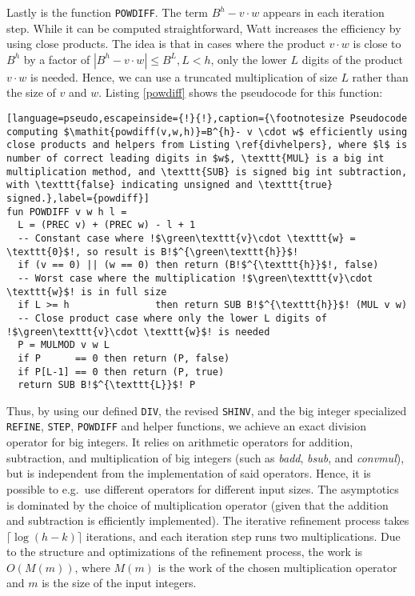Lastly is the function \texttt{POWDIFF}. The term $B^h-v \cdot w$ appears in each
iteration step. While it can be computed straightforward, Watt increases the
efficiency by using close products. The idea is that in cases where the product
$v\cdot w$ is close to $B^h$ by a factor of $|B^h- v\cdot w|\leq B^L, L < h$, only the
lower $L$ digits of the product $v \cdot w$ is needed. Hence, we can use a truncated
multiplication of size $L$ rather than the size of $v$ and $w$. Listing
\ref{powdiff} shows the pseudocode for this function:
\begin{lstlisting}[language=pseudo,escapeinside={!}{!},caption={\footnotesize Pseudocode computing $\mathit{powdiff(v,w,h)}=B^{h}- v \cdot w$ efficiently using close products and helpers from Listing \ref{divhelpers}, where $l$ is number of correct leading digits in $w$, \texttt{MUL} is a big int multiplication method, and \texttt{SUB} is signed big int subtraction, with \texttt{false} indicating unsigned and \texttt{true} signed.},label={powdiff}]
fun POWDIFF v w h l =
  L = (PREC v) + (PREC w) - l + 1
  -- Constant case where !$\green\texttt{v}\cdot \texttt{w} = \texttt{0}$!, so result is B!$^{\green\texttt{h}}$!
  if (v == 0) || (w == 0) then return (B!$^{\texttt{h}}$!, false)
  -- Worst case where the multiplication !$\green\texttt{v}\cdot \texttt{w}$! is in full size
  if L >= h               then return SUB B!$^{\texttt{h}}$! (MUL v w)
  -- Close product case where only the lower L digits of !$\green\texttt{v}\cdot \texttt{w}$! is needed
  P = MULMOD v w L
  if P      == 0 then return (P, false)
  if P[L-1] == 0 then return (P, true)
  return SUB B!$^{\texttt{L}}$! P
\end{lstlisting}

Thus, by using our defined \texttt{DIV}, the revised \texttt{SHINV}, and the big
integer specialized \texttt{REFINE}, \texttt{STEP}, \texttt{POWDIFF} and helper
functions, we achieve an exact division operator for big integers. It relies on
arithmetic operators for addition, subtraction, and multiplication of big
integers (such as \textit{badd}, \textit{bsub}, and \textit{convmul}), but is
independent from the implementation of said operators. Hence, it is possible to
e.g.\ use different operators for different input sizes. The asymptotics is
dominated by the choice of multiplication operator (given that the addition and
subtraction is efficiently implemented). The iterative refinement process takes
$\lceil \log (h-k) \rceil$ iterations, and each iteration step runs two
multiplications. Due to the structure and optimizations of the refinement
process, the work is $O(M(m))$, where $M(m)$ is the work of the chosen
multiplication operator and $m$ is the size of the input integers.




